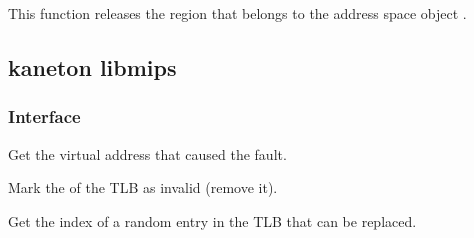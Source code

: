 	 {
	   This function releases the region  that belongs
	   to the address space object .
	 }

\subsection{kaneton libmips}

\subsubsection{Interface}

{
  Get the virtual address that caused the fault.
}

{

}

{

}

{
  Mark the  of the TLB as invalid (remove it).
}

{
  Get the index of a random entry in the TLB that can be replaced.
}


